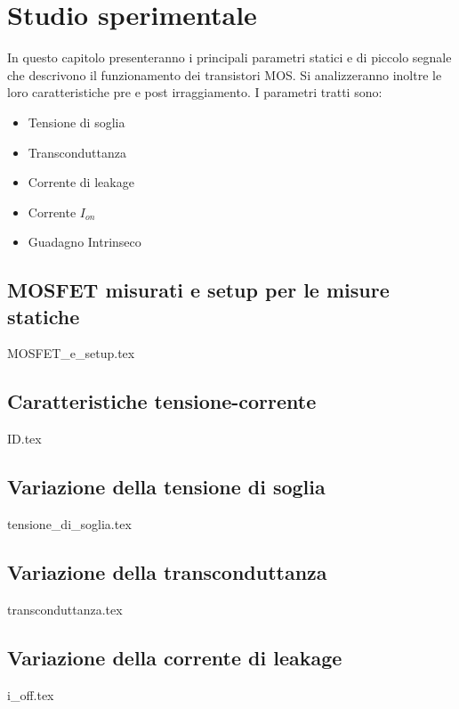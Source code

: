 \documentclass[
	a4paper,
	cleardoublepage=empty,
	headings=twolinechapter,
	numbers=autoenddot,
]{scrbook}
\begin{document}
\chapter{Studio sperimentale}
\label{cap2}
In questo capitolo presenteranno i principali parametri statici e di piccolo segnale che descrivono il funzionamento dei transistori MOS. Si analizzeranno inoltre le loro caratteristiche pre e post irraggiamento. I parametri tratti sono:
\begin{itemize}
  \item Tensione di soglia
  \item Transconduttanza
  \item Corrente di leakage
  \item Corrente $I_{on}$
  \item Guadagno Intrinseco
\end{itemize}

\section{MOSFET misurati e setup per le misure statiche}
{MOSFET_e_setup.tex}
\FloatBarrier

\section{Caratteristiche tensione-corrente}
{ID.tex}
\FloatBarrier

\section{Variazione della tensione di soglia}
\label{cap2:vth}
{tensione_di_soglia.tex}

\section{Variazione della transconduttanza}\label{sec:transconduttanza}
{transconduttanza.tex}

\section{Variazione della corrente di leakage}
{i_off.tex}
\end{document}
